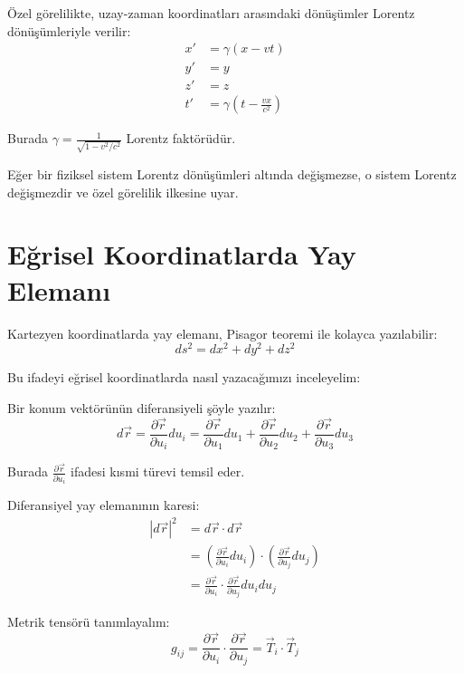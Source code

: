 \documentclass[11pt,letterpaper,twocolumn]{fenbil}
\begin{document}
Özel görelilikte, uzay-zaman koordinatları arasındaki dönüşümler Lorentz dönüşümleriyle verilir:
\begin{align}
x' &= \gamma(x - vt) \\
y' &= y \\
z' &= z \\
t' &= \gamma\left(t - \frac{vx}{c^2}\right)
\end{align}

Burada $\gamma = \frac{1}{\sqrt{1-v^2/c^2}}$ Lorentz faktörüdür.

Eğer bir fiziksel sistem Lorentz dönüşümleri altında değişmezse, o sistem Lorentz değişmezdir ve özel görelilik ilkesine uyar.

\section{Eğrisel Koordinatlarda Yay Elemanı}

Kartezyen koordinatlarda yay elemanı, Pisagor teoremi ile kolayca yazılabilir:
\begin{equation}
ds^2 = dx^2 + dy^2 + dz^2
\end{equation}

Bu ifadeyi eğrisel koordinatlarda nasıl yazacağımızı inceleyelim:

Bir konum vektörünün diferansiyeli şöyle yazılır:
\begin{equation}
d\vec{r} = \frac{\partial \vec{r}}{\partial u_i}du_i = \frac{\partial \vec{r}}{\partial u_1}du_1 + \frac{\partial \vec{r}}{\partial u_2}du_2 + \frac{\partial \vec{r}}{\partial u_3}du_3
\end{equation}

Burada $\frac{\partial \vec{r}}{\partial u_i}$ ifadesi kısmi türevi temsil eder.

Diferansiyel yay elemanının karesi:
\begin{align}
|d\vec{r}|^2 &= d\vec{r} \cdot d\vec{r} \\
&= \left(\frac{\partial \vec{r}}{\partial u_i}du_i\right) \cdot \left(\frac{\partial \vec{r}}{\partial u_j}du_j\right) \\
&= \frac{\partial \vec{r}}{\partial u_i} \cdot \frac{\partial \vec{r}}{\partial u_j} du_i du_j
\end{align}

Metrik tensörü tanımlayalım:
\begin{equation}
g_{ij} = \frac{\partial \vec{r}}{\partial u_i} \cdot \frac{\partial \vec{r}}{\partial u_j} = \vec{T}_i \cdot \vec{T}_j
\end{equation}
\end{document}

